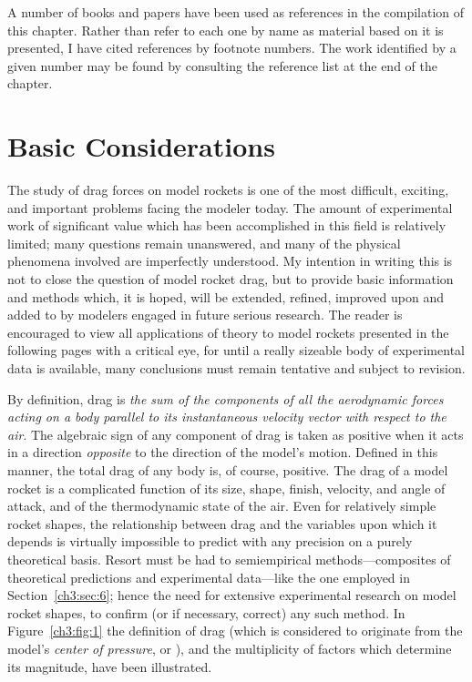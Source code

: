 A number of books and papers have been used as references in the compilation
of this chapter. Rather than refer to each one by name as material based on it
is presented, I have cited references by footnote numbers. The work identified
by a given number may be found by consulting the reference list at the end of
the chapter.

\section{Basic Considerations}\label{ch3:sec:1}

The study of drag forces on model rockets is one of the most difficult,
exciting, and important problems facing the modeler today. The amount of
experimental work of significant value which has been accomplished in this
field is relatively limited; many questions remain unanswered, and many of the
physical phenomena involved are imperfectly understood. My intention in
writing this is not to close the question of model rocket drag, but to provide
basic information and methods which, it is hoped, will be extended, refined,
improved upon and added to by modelers engaged in future serious research. The
reader is encouraged to view all applications of theory to model rockets
presented in the following pages with a critical eye, for until a really
sizeable body of experimental data is available, many conclusions must remain
tentative and subject to revision.

By definition, drag is \emph{the sum of the components of all the aerodynamic
forces acting on a body parallel to its instantaneous velocity vector with
respect to the air}. The algebraic sign of any component of drag is taken as
positive when it acts in a direction \emph{opposite} to the direction of the
model's motion. Defined in this manner, the total drag of any body is, of
course, positive. The drag of a model rocket is a complicated function of its
size, shape, finish, velocity, and angle of attack, and of the thermodynamic
state of the air. Even for relatively simple rocket shapes, the relationship
between drag and the variables upon which it depends is virtually impossible
to predict with any precision on a purely theoretical basis. Resort must be
had to semiempirical methods---composites of theoretical predictions and
experimental data---like the one employed in Section~\ref{ch3:sec:6}; hence the
need for extensive experimental research on model rocket shapes, to confirm
(or if necessary, correct) any such method. In Figure~\ref{ch3:fig:1} the
definition of drag (which is considered to originate from the model's
\emph{center of pressure}, or \CP), and the multiplicity of factors which
determine its magnitude, have been illustrated.

